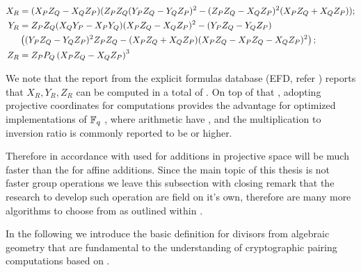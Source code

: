 \begin{align}
	X_R &= (\kettoszorzat{X}{Z}{P}{Q} - \kettoszorzat{X}{Z}{Q}{P})
	(\kettoszorzat{Z}{Z}{P}{Q} (\kettoszorzat{Y}{Z}{P}{Q} - \kettoszorzat{Y}{Z}{Q}{P})^2 - (\kettoszorzat{Z}{Z}{P}{Q} - \kettoszorzat{X}{Z}{Q}{P})^2  ( \kettoszorzat{X}{Z}{P}{Q} + \kettoszorzat{X}{Z}{Q}{P}));	\nonumber  \\
	Y_R	&= \kettoszorzat{Z}{Z}{P}{Q} (\kettoszorzat{X}{Y}{Q}{P} -  \kettoszorzat{X}{Y}{P}{Q} ) 
	(\kettoszorzat{X}{Z}{P}{Q} - \kettoszorzat{X}{Z}{Q}{P})^2 - 
	(\kettoszorzat{Y}{Z}{P}{Q} - \kettoszorzat{Y}{Z}{Q}{P})   \nonumber  \\
	& \left(  ( \kettoszorzat{Y}{Z}{P}{Q} - \kettoszorzat{Y}{Z}{Q}{P})^2 \kettoszorzat{Z}{Z}{P}{Q} - ( \kettoszorzat{X}{Z}{P}{Q}+ \kettoszorzat{X}{Z}{Q}{P} )( \kettoszorzat{X}{Z}{P}{Q} - \kettoszorzat{X}{Z}{P}{Q} - \kettoszorzat{X}{Z}{Q}{P} )^2 \right);	\nonumber  \\
	Z_R &= \kettoszorzat{Z}{P}{P}{Q} \left( \kettoszorzat{X}{Z}{P}{Q} - \kettoszorzat{X}{Z}{Q}{P}  \right)^3 \nonumber
\end{align}

We note that the report from the explicit formulas database (EFD, refer \cite{BL07a})  reports that $X_R, Y_R, Z_R$ can be computed in a total of \mathFormulaObject{12 \mathFormulaCostOfComputingMultiplication + 2 \mathFormulaCostOfComputingSquaring}. On top of that , adopting projective coordinates for computations provides the advantage for optimized implementations of $\FieldF_q$ , where arithmetic have \mathFormulaMuchGreaterThan{\mathFormulaCostOfComputingInversions}{20 \mathFormulaCostOfComputingMultiplication}, and the multiplication to
inversion ratio is commonly reported to be  or higher. 

Therefore in accordance with \cite{BL07a} \mathFormulaObject{12 \mathFormulaCostOfComputingMultiplication + 2 \mathFormulaCostOfComputingSquaring}  used for additions in projective space will be much faster than \mathFormulaObject{2 \mathFormulaCostOfComputingMultiplication + \mathFormulaCostOfComputingSquaring + \mathFormulaCostOfComputingInversions} the for affine additions. Since the main topic of this thesis is not faster group operations we leave this subsection with closing remark that the research to develop such operation are field on it's own, therefore are many more algorithms to choose from as outlined within \cite{His10}.

In the following  we introduce the basic definition for divisors from algebraic geometry that are fundamental to the understanding of cryptographic pairing
computations based on \cite{theory.pairings.for.beginners,menezes2004ECC}.



